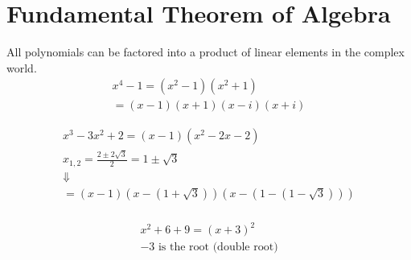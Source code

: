 \documentclass[00_complete]{subfiles}
\begin{document}
\section{Fundamental Theorem of Algebra}

All polynomials can be factored into a product of linear elements in the
complex world. \[
\begin{gathered}
x^4 -1 = (x^2-1)(x^2+1) \\
=(x-1)(x+1)(x-i)(x+i)\tag{1}
\end{gathered}
\]

\[
\begin{gathered}
\tag{2}
x^3-3x^2+2=(x-1)(x^2-2x-2) \\
x_{1,2}=\frac{2\pm2\sqrt{3}}{2} = 1\pm\sqrt 3 \\ \Downarrow \\
=(x-1)(x-(1+\sqrt 3))(x-(1-(1-\sqrt 3)))
\end{gathered}
\]

\[
\begin{gathered}
\tag{3}\\
x^2 + 6  + 9=(x+3)^2 \\
-3 \text{ is the root (double root)}
\end{gathered}
\]
\end{document}

